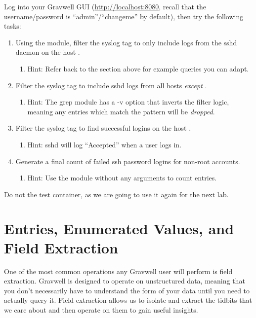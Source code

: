 Log into your Gravwell GUI (\href{http://localhost:8080}{http://localhost:8080}, recall that the username/password is ``admin''/``changeme'' by default), then try the following tasks:

\begin{enumerate}
\item
  Using the  module, filter the syslog tag to only include logs from the sshd daemon on the
  host .
	\begin{enumerate}
	\item
	  Hint: Refer back to the section above for example queries you can adapt.
	\end{enumerate}
\item
  Filter the syslog tag to include sshd logs from all hosts \emph{except} .
	\begin{enumerate}
	\item
	  Hint: The grep module has a -v option that inverts the filter logic, meaning any entries which match the pattern will be \emph{dropped}.
	\end{enumerate}
\item
  Filter the syslog tag to find successful logins on the host .
	\begin{enumerate}
	\item
	  Hint: sshd will log ``Accepted'' when a user logs in.
	\end{enumerate}
\item
  Generate a final count of failed ssh password logins for non-root
  accounts.
	\begin{enumerate}
	\item
	  Hint: Use the  module without any arguments to count entries.
	\end{enumerate}
\end{enumerate}

Do not  the test container, as we are
going to use it again for the next lab.

\clearpage
\section{Entries, Enumerated Values, and Field Extraction}
One of the most common operations any Gravwell user will perform is
field extraction. Gravwell is designed to operate on unstructured data,
meaning that you don't necessarily have to understand the form of your data
until you need to actually query it. Field extraction allows us to
isolate and extract the tidbits that we care about and then operate on
them to gain useful insights.

